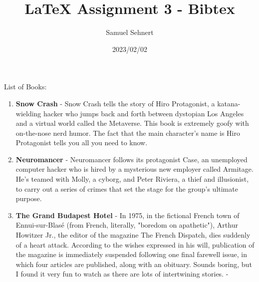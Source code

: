 \documentclass[10pt]{article}
\title{\LaTeX{} Assignment 3 - Bibtex}
\author{Samuel Sehnert}
\date{2023/02/02}
\begin{document}
    \maketitle
    List of Books:
    \begin{enumerate}
        \item \textbf{Snow Crash} - Snow Crash tells the story of Hiro Protagonist,
            a katana-wielding hacker who jumps back and forth between dystopian Los
            Angeles and a virtual world called the Metaverse. This book is extremely
            goofy with on-the-nose nerd humor. The fact that the main character's name
            is Hiro Protagonist tells you all you need to know\cite{snowcrash}.
        \item \textbf{Neuromancer} - Neuromancer follows its protagonist Case,
            an unemployed computer hacker who is hired by a mysterious new employer
            called Armitage. He’s teamed with Molly, a cyborg, and Peter Riviera, a
            thief and illusionist, to carry out a series of crimes that set the
            stage for the group’s ultimate purpose\cite{neuromancer}.
        \item \textbf{The Grand Budapest Hotel} \cite{frenchdispatch} -
            In 1975, in the fictional French town of Ennui-sur-Blasé (from French,
            literally, "boredom on apathetic"), Arthur Howitzer Jr., the editor of
            the magazine The French Dispatch, dies suddenly of a heart attack.
            According to the wishes expressed in his will, publication of the magazine
            is immediately suspended following one final farewell issue, in which four
            articles are published, along with an obituary. Sounds boring, but I found it
            very fun to watch as there are lots of intertwining stories. - \cite{frenchdispatch}
    \end{enumerate}

    
    
\end{document}

